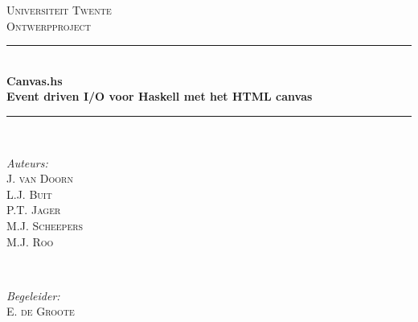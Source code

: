 \begin{titlepage}

\newcommand{\HRule}{\rule{\linewidth}{0.5mm}} %

\center %
\vspace*{\fill}
 

\textsc{\LARGE Universiteit Twente}\\[1.5cm] %
\textsc{\Large Ontwerpproject}\\[2.0cm] %


\HRule \\[0.6cm]
{ \huge \bfseries Canvas.hs}\\[0.4cm] %
{ \large \bfseries Event driven I/O voor Haskell met het HTML canvas}\\[0.4cm] %
\HRule \\[1.8cm]
 

\begin{minipage}[t]{0.4\textwidth}
\begin{flushleft} \large
\emph{Auteurs:}\\
J. \textsc{van Doorn}\\
L.J. \textsc{Buit}\\
P.T. \textsc{Jager}\\
M.J. \textsc{Scheepers}\\
M.J. \textsc{Roo}
\end{flushleft}
\end{minipage}
~
\begin{minipage}[t]{0.4\textwidth}
\begin{flushright} \large
\emph{Begeleider:} \\
E. \textsc{de Groote}
\end{flushright}
\end{minipage}\\[4cm]


\end{titlepage}

